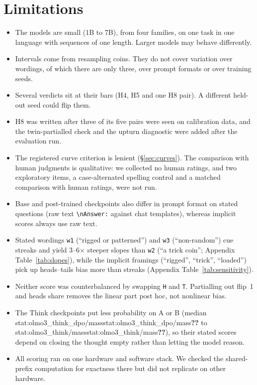 \documentclass[11pt]{article}
\newcommand{\stat}[1]{\ifcsname stat:#1\endcsname\csname stat:#1\endcsname\else\textbf{??}\fi}
\begin{document}
\section{Limitations}
\begin{itemize}
  \item The models are small (1B to 7B), from four families, on one task in one language with sequences of one length. Larger models may behave differently.
  \item Intervals come from resampling coins. They do not cover variation over wordings, of which there are only three, over prompt formats or over training seeds.
  \item Several verdicts sit at their bars (H4, H5 and one H8 pair). A different held-out seed could flip them.
  \item H8 was written after three of its five pairs were seen on calibration data, and the twin-partialled check and the upturn diagnostic were added after the evaluation run.
  \item The registered curve criterion is lenient (\S\ref{sec:curves}). The comparison with human judgments is qualitative: we collected no human ratings, and two exploratory items, a case-alternated spelling control and a matched comparison with human ratings, were not run.
  \item Base and post-trained checkpoints also differ in prompt format on stated questions (raw text \texttt{\textbackslash nAnswer:} against chat templates), whereas implicit scores always use raw text.
  \item Stated wordings \texttt{w1} (``rigged or patterned'') and \texttt{w3} (``non-random'') cue streaks and yield 3--6$\times$ steeper slopes than \texttt{w2} (``a trick coin''; Appendix Table~\ref{tab:slopes}), while the implicit framings (``rigged'', ``trick'', ``loaded'') pick up heads--tails bias more than streaks (Appendix Table~\ref{tab:sensitivity}).
  \item Neither score was counterbalanced by swapping \texttt{H} and \texttt{T}. Partialling out flip~1 and heads share removes the linear part post hoc, not nonlinear bias.
  \item The Think checkpoints put less probability on A or B (median \stat{olmo3_think_dpo/mass} to \stat{olmo3_think/mass}), so their stated scores depend on closing the thought empty rather than letting the model reason.
  \item All scoring ran on one hardware and software stack. We checked the shared-prefix computation for exactness there but did not replicate on other hardware.
\end{itemize}
\end{document}
